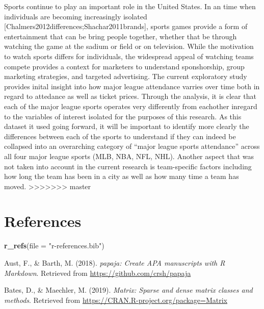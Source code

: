 \documentclass[man, fleqn, noextraspace,floatsintext]{apa6}
\newenvironment{Shaded}{\begin{snugshade}}{\end{snugshade}}
\newcommand{\DataTypeTok}[1]{\textcolor[rgb]{0.13,0.29,0.53}{#1}}
\newcommand{\KeywordTok}[1]{\textcolor[rgb]{0.13,0.29,0.53}{\textbf{#1}}}
\newcommand{\NormalTok}[1]{#1}
\newcommand{\StringTok}[1]{\textcolor[rgb]{0.31,0.60,0.02}{#1}}
\begin{document}
Sports continue to play an important role in the United States. In an time when individuals are becoming increasingly isolated {[}Chalmers2012differences;Shachar2011brands{]}, sports games provide a form of entertainment that can be bring people together, whether that be through watching the game at the sadium or field or on television. While the motivation to watch sports differs for individuals, the widespread appeal of watching teams compete provides a context for marketers to understand sponshorship, group marketing strategies, and targeted advertising.
The current exploratory study provides inital insight into how major league attendance varries over time both in regard to attedance as well as ticket prices. Through the analysis, it is clear that each of the major league sports operates very differently from eachother inregard to the variables of interest isolated for the purposes of this research.
As this dataset it used going forward, it will be important to identify more clearly the differences between each of the sports to understand if they can indeed be collapsed into an overarching category of \enquote{major league sports attendance} across all four major league sports (MLB, NBA, NFL, NHL). Another aspect that was not taken into account in the current research is team-specific factors including how long the team has been in a city as well as how many time a team has moved.
>>>>>>> master

\newpage

\section{References}\label{references}

\begin{Shaded}
\begin{Highlighting}[]
\KeywordTok{r_refs}\NormalTok{(}\DataTypeTok{file =} \StringTok{"r-references.bib"}\NormalTok{)}
\end{Highlighting}
\end{Shaded}

\begingroup
\setlength{\parindent}{-0.5in} \setlength{\leftskip}{0.5in}

\hypertarget{refs}{}
\hypertarget{ref-R-papaja}{}
Aust, F., \& Barth, M. (2018). \emph{papaja: Create APA manuscripts with
R Markdown}. Retrieved from \url{https://github.com/crsh/papaja}

\hypertarget{ref-R-Matrix}{}
Bates, D., \& Maechler, M. (2019). \emph{Matrix: Sparse and dense matrix
classes and methods}. Retrieved from
\url{https://CRAN.R-project.org/package=Matrix}
\end{document}
